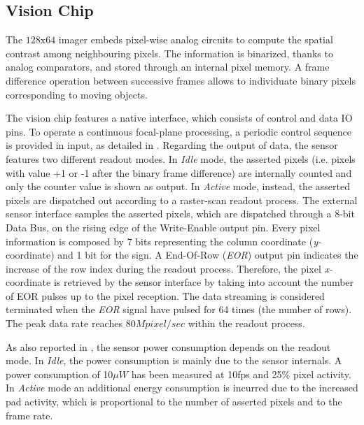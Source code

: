 \documentclass[journal]{IEEEtran}
\begin{document}
\subsection{Vision Chip}
\label{sec:grain}
The $128\mathrm{x}64$ imager \cite{Gottardi2009} embeds pixel-wise analog circuits to compute the spatial contrast among neighbouring pixels. The information is binarized, thanks to analog comparators, and stored through an internal pixel memory. A frame difference operation between successive frames allows to individuate binary pixels corresponding to moving objects. 

The vision chip features a native interface, which consists of control and data IO pins. To operate a continuous focal-plane processing, a periodic control sequence is provided in input, as detailed in \cite{Gottardi2009}. Regarding the output of data, the sensor features two different readout modes. In \textit{Idle} mode, the asserted pixels (i.e. pixels with value +1 or -1 after the binary frame difference) are internally counted and only the counter value is shown as output. In \textit{Active} mode, instead, the asserted pixels are dispatched out according to a raster-scan readout process. 
The external sensor interface samples the asserted pixels, which are dispatched through a 8-bit Data Bus, on the rising edge of the Write-Enable output pin. 
Every pixel information is composed by 7 bits representing the column coordinate (\textit{y-}coordinate) and 1 bit for the sign.
A End-Of-Row (\textit{EOR}) output pin indicates the increase of the row index during the readout process. Therefore, the pixel \textit{x-}coordinate is retrieved by the sensor interface by taking into account the number of EOR pulses up to the pixel reception.
The data streaming is considered terminated when the \textit{EOR} signal have pulsed for 64 times (the number of rows). The peak data rate reaches $80Mpixel/sec$ within the readout process. 

As also reported in \cite{Gottardi2009}, the sensor power consumption depends on the readout mode. In \textit{Idle}, the power consumption is mainly due to the sensor internals. A power consumption of 10$\mu W$ has been measured at 10fps and 25\% pixel activity. In \textit{Active} mode an additional energy consumption is incurred due to the increased pad activity, which is proportional to the number of asserted pixels and to the frame rate.

			
\end{document}
